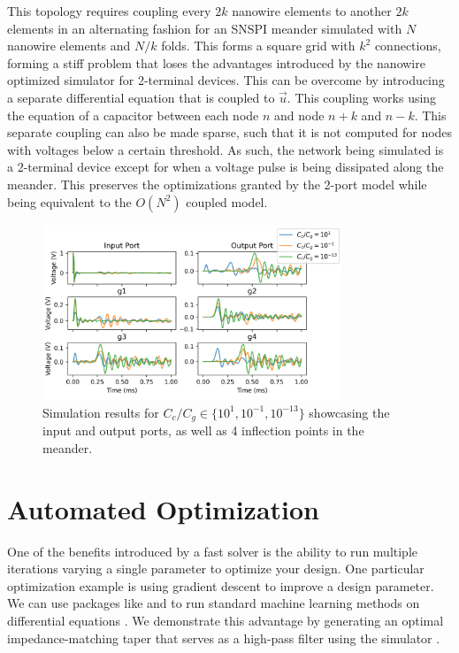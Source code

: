 This topology requires coupling every $2k$ nanowire elements to another $2k$ elements in an alternating 
fashion for an SNSPI meander simulated with $N$ nanowire elements and $N/k$ folds. This forms a square
grid with $k^2$ connections, forming a stiff problem that loses the advantages introduced by the
nanowire optimized simulator for 2-terminal devices. This can be overcome by introducing a separate
differential equation that is coupled to $\vec u$. This coupling works using the equation of a capacitor
between each node $n$ and node $n+k$ and $n-k$. This separate coupling can also be made sparse, such that
it is not computed for nodes with voltages below a certain threshold. As such, the network being simulated
is a 2-terminal device except for when a voltage pulse is being dissipated along the meander.
This preserves the optimizations granted by the 2-port model while being equivalent to the $O(N^2)$
coupled model.

\begin{figure}
    \centering
    \includegraphics[width=0.8\textwidth]{figs/snspi_coupled_data.png}
    \caption{Simulation results for $C_c/C_g\in \{ 10^1, 10^{-1}, 10^{-13}\}$ showcasing
    the input and output ports, as well as 4 inflection points in the meander.}
    \label{fig:snspi_coupled_data}
\end{figure}

\section{Automated Optimization}

One of the benefits introduced by a fast solver is the ability to run multiple iterations varying a
single parameter to optimize your design. One particular optimization example is using gradient descent
to improve a design parameter. We can use packages like  and  to run standard
machine learning methods on differential equations \cite{fluxjl, optimjl}. We demonstrate this
advantage by generating an optimal impedance-matching taper that serves as a high-pass filter 
using the simulator \cite{optimum-taper}.

